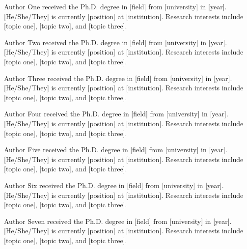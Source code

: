 \documentclass[journal]{IEEEtran}
\theoremstyle{definition}
\begin{document}
\makeatletter
\def\@IEEEBIOphotowidth{0.74in}
\def\@IEEEBIOphotodepth{0.58in}
\def\@IEEEBIOhangwidth{0.84in}
\def\@IEEEBIOhangdepth{0.58in}
\def\@IEEEBIOskipN{0.05\baselineskip}
\makeatother
\begin{IEEEbiography}[{{\fbox{\rule{0pt}{0.52in}\rule{0.62in}{0pt}}}}]{Author One}
received the Ph.D. degree in [field] from [university] in [year]. [He/She/They] is currently [position] at [institution]. Research interests include [topic one], [topic two], and [topic three].
\end{IEEEbiography}
\begin{IEEEbiography}[{{\fbox{\rule{0pt}{0.52in}\rule{0.62in}{0pt}}}}]{Author Two}
received the Ph.D. degree in [field] from [university] in [year]. [He/She/They] is currently [position] at [institution]. Research interests include [topic one], [topic two], and [topic three].
\end{IEEEbiography}
\begin{IEEEbiography}[{{\fbox{\rule{0pt}{0.52in}\rule{0.62in}{0pt}}}}]{Author Three}
received the Ph.D. degree in [field] from [university] in [year]. [He/She/They] is currently [position] at [institution]. Research interests include [topic one], [topic two], and [topic three].
\end{IEEEbiography}
\begin{IEEEbiography}[{{\fbox{\rule{0pt}{0.52in}\rule{0.62in}{0pt}}}}]{Author Four}
received the Ph.D. degree in [field] from [university] in [year]. [He/She/They] is currently [position] at [institution]. Research interests include [topic one], [topic two], and [topic three].
\end{IEEEbiography}
\begin{IEEEbiography}[{{\fbox{\rule{0pt}{0.52in}\rule{0.62in}{0pt}}}}]{Author Five}
received the Ph.D. degree in [field] from [university] in [year]. [He/She/They] is currently [position] at [institution]. Research interests include [topic one], [topic two], and [topic three].
\end{IEEEbiography}
\begin{IEEEbiography}[{{\fbox{\rule{0pt}{0.52in}\rule{0.62in}{0pt}}}}]{Author Six}
received the Ph.D. degree in [field] from [university] in [year]. [He/She/They] is currently [position] at [institution]. Research interests include [topic one], [topic two], and [topic three].
\end{IEEEbiography}
\begin{IEEEbiography}[{{\fbox{\rule{0pt}{0.52in}\rule{0.62in}{0pt}}}}]{Author Seven}
received the Ph.D. degree in [field] from [university] in [year]. [He/She/They] is currently [position] at [institution]. Research interests include [topic one], [topic two], and [topic three].
\end{IEEEbiography}
\end{document}
